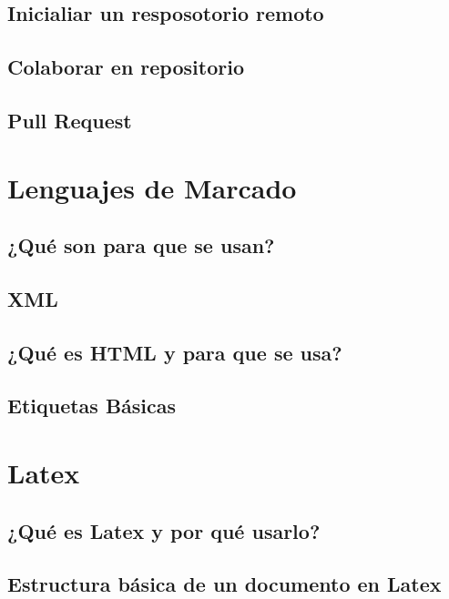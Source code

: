 \documentclass[11pt,letterpaper]{article}
\begin{document}
\subsection{Inicialiar un resposotorio remoto}
\subsection{Colaborar en repositorio}
\subsection{Pull Request}
\section{Lenguajes de Marcado}
\subsection{¿Qué son para que se usan?}
\subsection{XML}
\subsection{¿Qué es HTML y para que se usa?}
\subsection{Etiquetas Básicas}
\section{Latex}
\subsection{¿Qué es Latex y por qué usarlo?}
\subsection{Estructura básica de un documento en Latex}
\end{document}
